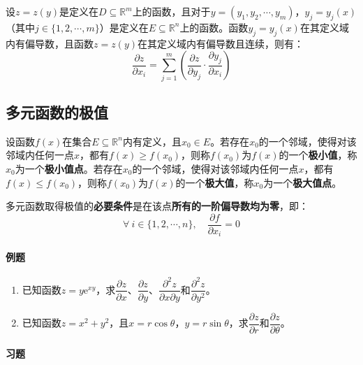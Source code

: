 \documentclass[fontset=none,openany,a4paper]{ctexbook}
\begin{document}
设$z=z(y)$是定义在$D\subseteq\mathbb{R}^m$上的函数，且对于$y=(y_1,y_2,\cdots,y_m)$，$y_j=y_j(x)$（其中$j\in\{1,2,\cdots,m\}$）是定义在$E\subseteq\mathbb{R}^n$上的函数。函数$y_j=y_j(x)$在其定义域内有偏导数，且函数$z=z(y)$在其定义域内有偏导数且连续，则有：
\[
\frac{\partial z}{\partial x_i} = \sum_{j=1}^m \left(\frac{\partial z}{\partial y_j} \cdot \frac{\partial y_j}{\partial x_i}\right)
\]

\subsection{多元函数的极值}

设函数$f(x)$在集合$E\subseteq\mathbb{R}^n$内有定义，且$x_0\in E$。若存在$x_0$的一个邻域，使得对该邻域内任何一点$x$，都有$f(x)\geqslant f(x_0)$，则称$f(x_0)$为$f(x)$的一个\textbf{极小值}，称$x_0$为一个\textbf{极小值点}。若存在$x_0$的一个邻域，使得对该邻域内任何一点$x$，都有$f(x)\leqslant f(x_0)$，则称$f(x_0)$为$f(x)$的一个\textbf{极大值}，称$x_0$为一个\textbf{极大值点}。

多元函数取得极值的\textbf{必要条件}是在该点\textbf{所有的一阶偏导数均为零}，即：
\[
\forall\ i\in\{1,2,\cdots,n\},\quad \frac{\partial f}{\partial x_i} = 0
\]

\paragraph{例题}

\begin{enumerate}

    \item 已知函数$z=y\mathrm{e}^{xy}$，求$\dfrac{\partial z}{\partial x}$、$\dfrac{\partial z}{\partial y}$、$\dfrac{\partial^2 z}{\partial x\partial y}$和$\dfrac{\partial^2 z}{\partial y^2}$。

    \item 已知函数$z=x^2+y^2$，且$x=r\cos\theta$，$y=r\sin\theta$，求$\dfrac{\partial z}{\partial r}$和$\dfrac{\partial z}{\partial\theta}$。

\end{enumerate}

\paragraph{习题}
\end{document}
